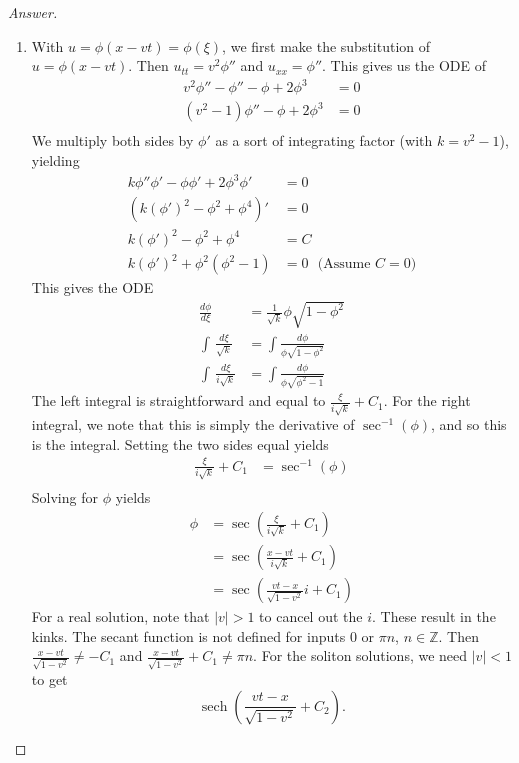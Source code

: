 \documentclass{article}
\theoremstyle{definition}
\renewcommand\qedsymbol{$\blacksquare$}
\newenvironment{ans}{\begin{proof}[Answer]\renewcommand{\qedsymbol}{}}{\end{proof}}
\newcommand{\Z}{\mathbb{Z}}
\DeclareMathOperator{\sech}{sech}
\begin{document}
\begin{ans}
\begin{enumerate}
    
    \item With $u = \phi(x-vt) = \phi(\xi)$, we first make the substitution of $u = \phi(x-vt)$. Then $u_{tt} = v^2\phi''$ and $u_{xx} = \phi''$. This gives us the ODE of
    \begin{align*}
        v^2\phi''-\phi''-\phi+2\phi^3 &= 0\\
        (v^2-1)\phi''-\phi+2\phi^3&=0\\
    \end{align*}
    We multiply both sides by $\phi'$ as a sort of integrating factor (with $k = v^2-1$), yielding
    \begin{align*}
        k\phi''\phi'-\phi\phi'+2\phi^3\phi'&=0\\
        \left(k(\phi')^2-\phi^2+\phi^4 \right)'&=0\\
        k(\phi')^2-\phi^2+\phi^4 &= C\\
        k(\phi')^2+\phi^2(\phi^2-1) &= 0 \ \ \ \text{(Assume } C = 0 \text{)}
    \end{align*}
    This gives the ODE
    \begin{align*}
        \frac{d\phi}{d\xi} &= \frac{1}{\sqrt{k}}\phi\sqrt{1-\phi^2}\\
         \int\,\frac{d\xi}{\sqrt{k}} &= \int \frac{d\phi}{\phi\sqrt{1-\phi^2}}\\
         \int\,\frac{d\xi}{i\sqrt{k}} &= \int \frac{d\phi}{\phi\sqrt{\phi^2-1}}
    \end{align*}
    The left integral is straightforward and equal to $\frac{\xi}{i\sqrt{k}}+C_1$. For the right integral, we note that this is simply the derivative of $\sec^{-1}(\phi)$, and so this is the integral.
    Setting the two sides equal yields
    \begin{align*}
        \frac{\xi}{i\sqrt{k}}+C_1 &= \sec^{-1}(\phi)\\
    \end{align*}
    Solving for $\phi$ yields
    \begin{align*}
        \phi &= \sec\left(\frac{\xi}{i\sqrt{k}}+C_1\right)\\
        &= \sec\left(\frac{x-vt}{i\sqrt{k}}+C_1\right)\\
        &= \sec\left(\frac{vt-x}{\sqrt{1-v^2}}i+C_1\right)
    \end{align*}
    For a real solution, note that $|v| > 1$ to cancel out the $i$. These result in the kinks. The secant function is not defined for inputs $0$ or $\pi n$, $n \in \Z$. Then $\frac{x-vt}{\sqrt{1-v^2}} \neq -C_1$ and $\frac{x-vt}{\sqrt{1-v^2}}+C_1 \neq \pi n$. For the soliton solutions, we need $|v| < 1$ to get 
    \[\sech\left(\frac{vt-x}{\sqrt{1-v^2}} + C_2\right).\]
    \end{enumerate}
\end{ans}
\end{document}

